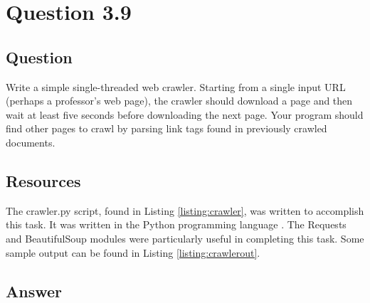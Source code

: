 \section{Question 3.9}

\subsection{Question}
Write a simple single-threaded web crawler. Starting from a single input URL (perhaps a professor's web page), the crawler should download a page and then wait at least five seconds before downloading the next page. Your program should find other pages to crawl by parsing link tags found in previously crawled documents.


\subsection{Resources}
The {\ttfamily crawler.py} script, found in Listing \ref{listing:crawler}, was written to accomplish this task.  It was written in the Python programming language \cite{python}.  The Requests \cite{py:requests} and BeautifulSoup \cite{py:beautifulsoup} modules were particularly useful in completing this task.  Some sample output can be found in Listing \ref{listing:crawlerout}.


\subsection{Answer}


